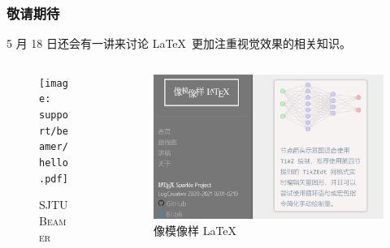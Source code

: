 \begin{frame}
  \frametitle{敬请期待}
  
  5 月 18 日还会有一讲来讨论 \LaTeX\ 更加注重视觉效果的相关知识。

  \begin{columns}
    \begin{column}{0.5\textwidth}
      \begin{figure}
        \begin{stampbox}[sjtuRedPrimary]
          \texttt{[image: support/beamer/hello.pdf]}
        \end{stampbox}
        \caption{\textsc{SJTUBeamer} }
      \end{figure}
    \end{column}
    \begin{column}{0.5\textwidth}
      \begin{figure}
        \begin{stampbox}[sjtuRedPrimary]
          \includegraphics[height=0.4\textheight]{support/images/latexsparkle.jpg}
        \end{stampbox}
        \caption{像模像样 \LaTeX\ }
      \end{figure}
    \end{column}
  \end{columns}
\end{frame}